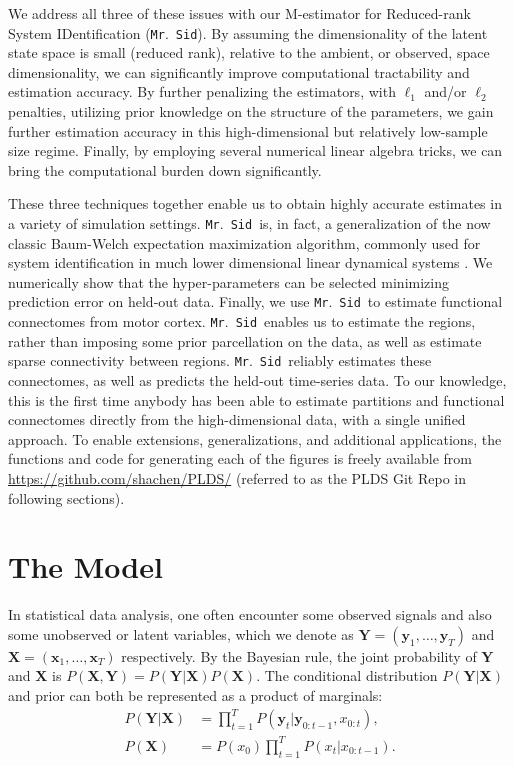 \documentclass[fleqn,12pt]{article}
\newcommand{\mrsid}{{\sc \texttt{Mr}.~\texttt{Sid}}}
\providecommand{\mb}[1]{\boldsymbol{#1}}
\newcommand{\bx}{\mb{x}}
\newcommand{\by}{\mb{y}}
\newcommand{\bX}{\mb{X}}
\newcommand{\bY}{\mb{Y}}
\begin{document}
We address all three of these issues with our M-estimator for Reduced-rank  System IDentification (\mrsid).  By assuming the dimensionality of the latent state space is small (reduced rank), relative to the ambient, or observed, space dimensionality, we can significantly improve computational tractability and estimation accuracy. By further penalizing the estimators, with $\ell_1$ and/or $\ell_2$ penalties, utilizing prior knowledge on the structure of the parameters, we gain further estimation accuracy in this high-dimensional but relatively low-sample size regime.  Finally, by employing several numerical linear algebra tricks, we can bring the computational burden down significantly.

These three techniques together enable us to obtain highly accurate estimates in a variety of simulation settings.  \mrsid~is, in fact, a generalization of the now classic Baum-Welch expectation maximization algorithm, commonly used for system identification in much lower dimensional linear dynamical systems \citep{rabiner1989tutorial}. We numerically show that the hyper-parameters can be selected minimizing prediction error on held-out data.  Finally, we use \mrsid~to estimate functional connectomes from motor cortex.  \mrsid~enables us to estimate the regions, rather than imposing some prior parcellation on the data, as well as estimate sparse connectivity between regions.  \mrsid~reliably estimates these connectomes, as well as predicts the held-out time-series data.  To our knowledge, this is the first time anybody has been able to estimate partitions and functional connectomes directly from the high-dimensional data, with a single unified approach.  To enable extensions, generalizations, and additional applications, the functions and code for generating each of the figures is freely available from \url{https://github.com/shachen/PLDS/} (referred to as the PLDS Git Repo in following sections).



\section{The Model}

In statistical data analysis, one often encounter some observed signals and also some unobserved or latent variables, which we denote as $\bY=(\by_1,\ldots,\by_T)$ and $\bX=(\bx_1,\ldots,\bx_T)$ respectively. By the Bayesian rule, the joint probability of $\bY$ and $\bX$ is $P(\bX,\bY)=P(\bY|\bX) P(\bX)$. The conditional distribution $P(\mb{Y}|\mb{X})$ and prior can both be represented as a product of marginals:
\begin{equation}
\begin{aligned}
P(\mb{Y}|\mb{X}) &= \prod_{t=1}^T P(\by_t | \by_{0:t-1}, x_{0:t}), \\
P(\bX) &= P(x_0) \prod_{t=1}^T P(x_t | x_{0:t-1}).
\end{aligned}
\end{equation}
\end{document}
